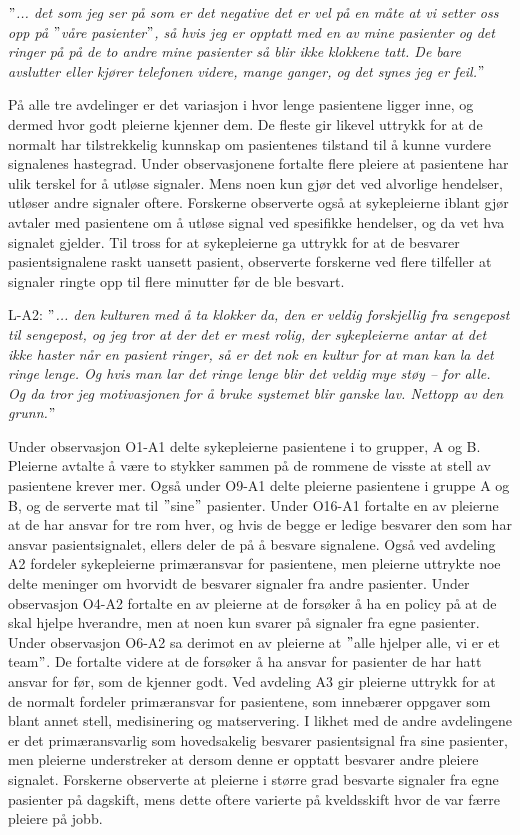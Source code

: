\noindent
\textit{$"$... det som jeg ser på som er det negative det er vel på en måte at vi setter oss opp på $"$våre pasienter$"$, så hvis jeg er opptatt med en av mine pasienter og det ringer på på de to andre mine pasienter så blir ikke klokkene tatt. De bare avslutter eller kjører telefonen videre, mange ganger, og det synes jeg er feil.$"$}

\noindent
På alle tre avdelinger er det variasjon i hvor lenge pasientene ligger inne, og dermed hvor godt pleierne kjenner dem. De fleste gir likevel uttrykk for at de normalt har tilstrekkelig kunnskap om pasientenes tilstand til å kunne vurdere signalenes hastegrad. Under observasjonene fortalte flere pleiere at pasientene har ulik terskel for å utløse signaler. Mens noen kun gjør det ved alvorlige hendelser, utløser andre signaler oftere. Forskerne observerte også at sykepleierne iblant gjør avtaler med pasientene om å utløse signal ved spesifikke hendelser, og da vet hva signalet gjelder. Til tross for at sykepleierne ga uttrykk for at de besvarer pasientsignalene raskt uansett pasient, observerte forskerne ved flere tilfeller at signaler ringte opp til flere minutter før de ble besvart.  
  
\noindent
L-A2: \textit{$"$... den kulturen med å ta klokker da, den er veldig forskjellig fra sengepost til sengepost, og jeg tror at der det er mest rolig, der sykepleierne antar at det ikke haster når en pasient ringer, så er det nok en kultur for at man kan la det ringe lenge. Og hvis man lar det ringe lenge blir det veldig mye støy – for alle. Og da tror jeg motivasjonen for å bruke systemet blir ganske lav. Nettopp av den grunn.$"$}

\noindent
Under observasjon O1-A1 delte sykepleierne pasientene i to grupper, A og B. Pleierne avtalte å være to stykker sammen på de rommene de visste at stell av pasientene krever mer. Også under O9-A1 delte pleierne pasientene i gruppe A og B, og de serverte mat til $"$sine$"$ pasienter. Under O16-A1 fortalte en av pleierne at de har ansvar for tre rom hver, og hvis de begge er ledige besvarer den som har ansvar pasientsignalet, ellers deler de på å besvare signalene. Også ved avdeling A2 fordeler sykepleierne primæransvar for pasientene, men pleierne uttrykte noe delte meninger om hvorvidt de besvarer signaler fra andre pasienter. Under observasjon O4-A2 fortalte en av pleierne at de forsøker å ha en policy på at de skal hjelpe hverandre, men at noen kun svarer på signaler fra egne pasienter. Under observasjon O6-A2 sa derimot en av pleierne at $"$alle hjelper alle, vi er et team$"$. De fortalte videre at de forsøker å ha ansvar for pasienter de har hatt ansvar for før, som de kjenner godt. Ved avdeling A3 gir pleierne uttrykk for at de normalt fordeler primæransvar for pasientene, som innebærer oppgaver som blant annet stell, medisinering og matservering. I likhet med de andre avdelingene er det primæransvarlig som hovedsakelig besvarer pasientsignal fra sine pasienter, men pleierne understreker at dersom denne er opptatt besvarer andre pleiere signalet. Forskerne observerte at pleierne i større grad besvarte signaler fra egne pasienter på dagskift, mens dette oftere varierte på kveldsskift hvor de var færre pleiere på jobb.

